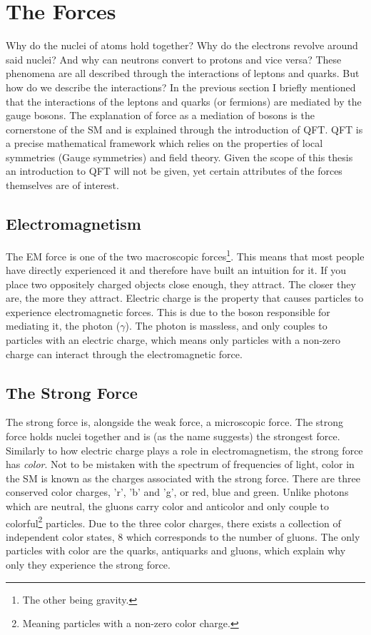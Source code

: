 \section{The Forces}
Why do the nuclei of atoms hold together? Why do the electrons revolve
around said nuclei? And why can neutrons convert to protons and vice versa? These phenomena 
are all described through the interactions of leptons and quarks. But how do we describe the 
interactions? In the previous section I briefly mentioned that the interactions of the leptons 
and quarks (or fermions) are mediated by the gauge bosons. The explanation of force as 
a mediation of bosons is the cornerstone of the \ac{SM} and is explained through 
the introduction of \ac{QFT}. \ac{QFT} is a precise mathematical framework which relies on the 
properties of local symmetries (Gauge symmetries) and field theory. Given the scope of this thesis
an introduction to \ac{QFT} will not be given, yet certain attributes of the forces themselves
are of interest. 
\subsection{Electromagnetism}
The \acf{EM} force is one of the two macroscopic forces\footnote{The other being gravity.}.
This means that most people have directly experienced it and therefore have built an intuition for
it. If you place two oppositely charged objects close enough, they attract. The closer they are, 
the more they attract. Electric charge is the property that causes particles to 
experience electromagnetic forces. This is due to the boson responsible for mediating it, 
the photon ($\gamma$). The photon is massless, and only couples to particles with an electric charge,
which means only particles with a non-zero charge can interact through the electromagnetic force.
\subsection{The Strong Force}
The strong force is, alongside the weak force, a microscopic force. The strong force 
holds nuclei together and is (as the name suggests) the strongest force. Similarly to how electric 
charge plays a role in electromagnetism, the strong force has \emph{color}. Not to be mistaken 
with the spectrum of frequencies of light, color in the \ac{SM} is known as the charges 
associated with the strong force. There are three conserved color charges, 'r', 'b' and 'g', or red, blue and green. 
Unlike photons which are neutral, the gluons carry color and anticolor and only couple to 
colorful\footnote{Meaning particles with a non-zero color charge.} particles. 
Due to the three color charges, there exists a collection of independent color states, 8 which 
corresponds to the number of gluons. The only particles with color are the quarks, antiquarks and gluons, which explain why 
only they experience the strong force. 
